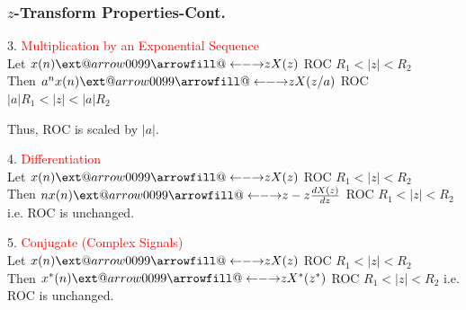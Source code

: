\documentclass[mathserif, 10pt]{beamer} %
\makeatletter
\newcommand\xleftrightarrow[2][]{\ext@arrow 0099{\longleftrightarrowfill@}{#1}{#2}}
\def\longleftrightarrowfill@{\arrowfill@\leftarrow\relbar\rightarrow}
\makeatother
\begin{document}
\frame
{
\frametitle{$z$-Transform Properties-Cont.}
3. \textcolor{red}{Multiplication by an Exponential Sequence}\\ \vspace{.1in}
Let $x(n) \xleftrightarrow[]{z} X(z) $  \hspace{0.2in}  ROC  $R_1<|z|<R_2$\\ \vspace{.1in}
Then $a^nx(n) \xleftrightarrow[]{z} X(z/a)$  \hspace{0.2in}  ROC  $|a|R_1<|z|<|a|R_2$ \\ \vspace{.1in}

Thus, ROC is scaled by $|a|$. \\ \vspace{.1in}

4. \textcolor{red}{ Differentiation}\\ \vspace{.1in}
Let $x(n) \xleftrightarrow[]{z} X(z) $  \hspace{0.2in}  ROC  $R_1<|z|<R_2$\\ \vspace{.1in}
Then $nx(n) \xleftrightarrow[]{z} -z \frac{dX(z)}{dz}$  \hspace{0.2in}  ROC  $R_1<|z|<R_2$ \hspace{0.2in} i.e. ROC is unchanged. \\ \vspace{.1in}

5.  \textcolor{red}{Conjugate (Complex Signals)}\\ \vspace{.1in}
Let $x(n) \xleftrightarrow[]{z} X(z) $  \hspace{0.2in}  ROC  $R_1<|z|<R_2$\\ \vspace{.1in}
Then $x^*(n) \xleftrightarrow[]{z}  X^*(z^*)$  \hspace{0.2in}  ROC  $R_1<|z|<R_2$  \hspace{0.2in} i.e. ROC is unchanged.

}
\end{document}
